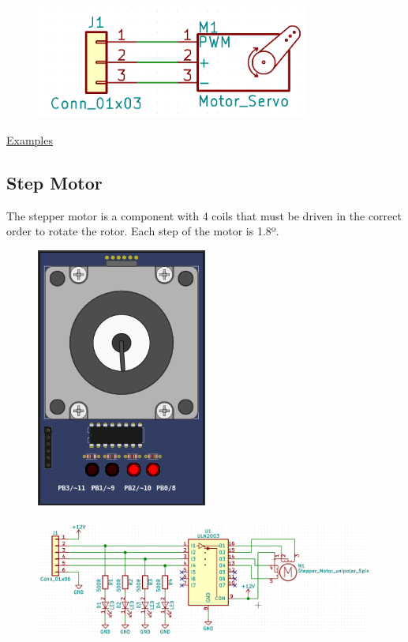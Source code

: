 \begin{figure}[H]
\center
\includegraphics[width=0.8\textwidth]{img/part_servo_.png} 
\end{figure} 

\href{https://lcgamboa.github.io/picsimlab_examples/examples/examples_index.html\#Servo\_motor}{Examples}


\subsection{Step Motor}

The stepper motor is a component with 4 coils that must be driven in the correct order to rotate the rotor.
Each step of the motor is 1.8º.

\begin{figure}[H]
\center
\includegraphics[width=0.5\textwidth]{img/part_step.png} 
\end{figure} 

\begin{figure}[H]
\center
\includegraphics[width=0.99\textwidth]{img/part_step_.png} 
\end{figure} 

